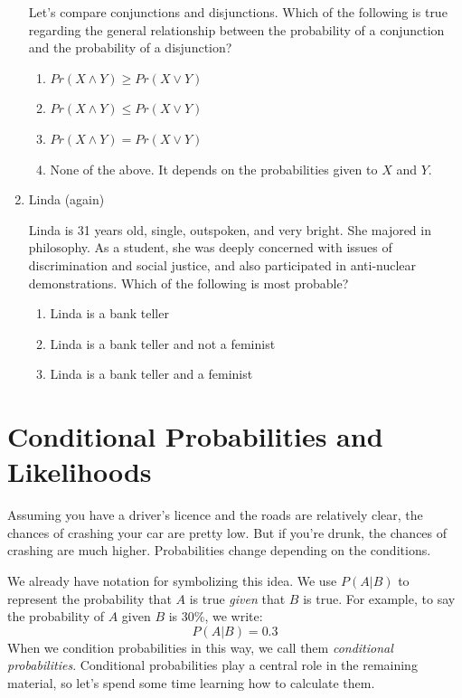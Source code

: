\documentclass[]{tufte-book}
\providecommand{\tightlist}{%
  \setlength{\itemsep}{0pt}\setlength{\parskip}{0pt}}
\begin{document}
\begin{enumerate}
  Let's compare conjunctions and disjunctions. Which of the following is true regarding the general relationship between the probability of a conjunction and the probability of a disjunction?

  \begin{enumerate}
  \def\labelenumii{\alph{enumii}.}
  \tightlist
  \item
    \(Pr(X\wedge Y)\geq Pr(X\vee Y)\)
  \item
    \(Pr(X\wedge Y)\leq Pr(X\vee Y)\)
  \item
    \(Pr(X\wedge Y) = Pr(X\vee Y)\)
  \item
    None of the above. It depends on the probabilities given to \(X\) and \(Y\).
  \end{enumerate}
\item
  Linda (again)

  Linda is 31 years old, single, outspoken, and very bright. She majored in philosophy. As a student, she was deeply concerned with issues of discrimination and social justice, and also participated in anti-nuclear demonstrations. Which of the following is most probable?

  \begin{enumerate}
  \def\labelenumii{\alph{enumii}.}
  \tightlist
  \item
    Linda is a bank teller
  \item
    Linda is a bank teller and not a feminist
  \item
    Linda is a bank teller and a feminist
  \end{enumerate}
\end{enumerate}

\hypertarget{conditional-probabilities-and-likelihoods}{%
\chapter{Conditional Probabilities and Likelihoods}\label{conditional-probabilities-and-likelihoods}}

Assuming you have a driver's licence and the roads are relatively clear, the chances of crashing your car are pretty low. But if you're drunk, the chances of crashing are much higher. Probabilities change depending on the conditions.

We already have notation for symbolizing this idea. We use \(P(A | B)\) to represent the probability that \(A\) is true \emph{given} that \(B\) is true. For example, to say the probability of \(A\) given \(B\) is 30\%, we write:
\[ P(A | B) = 0.3 \]
When we condition probabilities in this way, we call them \emph{conditional probabilities}. Conditional probabilities play a central role in the remaining material, so let's spend some time learning how to calculate them.
\end{document}

